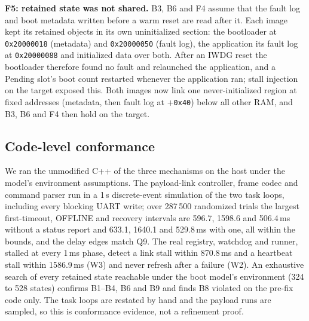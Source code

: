 \documentclass[conference,a4paper]{IEEEtran}
\begin{document}
\textbf{F5: retained state was not shared.} B3, B6 and F4 assume that the fault log and boot metadata written before a warm reset are read after it. Each image kept its retained objects in its own uninitialized section: the bootloader at \texttt{0x20000018} (metadata) and \texttt{0x20000050} (fault log), the application its fault log at \texttt{0x20000088} and initialized data over both. After an IWDG reset the bootloader therefore found no fault and relaunched the application, and a Pending slot's boot count restarted whenever the application ran; stall injection on the target exposed this. Both images now link one never-initialized region at fixed addresses (metadata, then fault log at +\texttt{0x40}) below all other RAM, and B3, B6 and F4 then hold on the target.

\subsection{Code-level conformance}
\label{sec:code}
We ran the unmodified C++ of the three mechanisms on the host under the model's environment assumptions. The payload-link controller, frame codec and command parser run in a 1\,\textmu s discrete-event simulation of the two task loops, including every blocking UART write; over 287\,500 randomized trials the largest first-timeout, OFFLINE and recovery intervals are 596.7, 1598.6 and 506.4\,ms without a status report and 633.1, 1640.1 and 529.8\,ms with one, all within the bounds, and the delay edges match Q9. The real registry, watchdog and runner, stalled at every 1\,ms phase, detect a link stall within 870.8\,ms and a heartbeat stall within 1586.9\,ms (W3) and never refresh after a failure (W2). An exhaustive search of every retained state reachable under the boot model's environment (324 to 528 states) confirms B1--B4, B6 and B9 and finds B8 violated on the pre-fix code only. The task loops are restated by hand and the payload runs are sampled, so this is conformance evidence, not a refinement proof.
\end{document}
